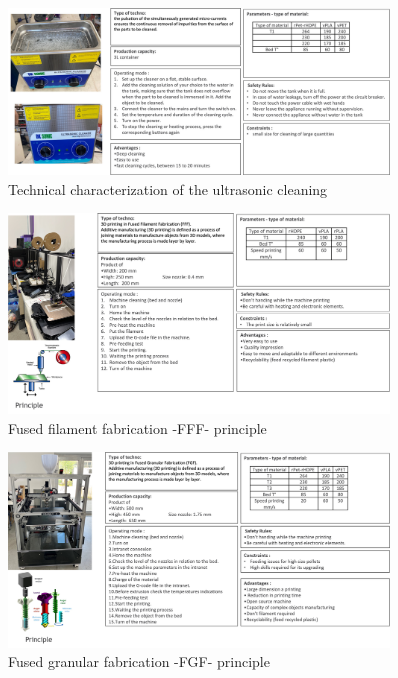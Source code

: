 \documentclass[
  11pt,
]{article}
\begin{document}
\begin{figure}[H]

{\centering \includegraphics[width=0.9\textwidth,height=\textheight]{figures/cleaning/cleanning-01.jpg}

}

\caption{Technical characterization of the ultrasonic cleaning}

\end{figure}

\begin{figure}[H]

{\centering \includegraphics[width=0.9\textwidth,height=\textheight]{figures/printing/FFF-01.jpg}

}

\caption{\label{fig-fff}Fused filament fabrication -FFF- principle}

\end{figure}

\begin{figure}[H]

{\centering \includegraphics[width=0.9\textwidth,height=\textheight]{figures/printing/Gigabot.jpg}

}

\caption{\label{fig-gigabot}Fused granular fabrication -FGF- principle}

\end{figure}
\end{document}
